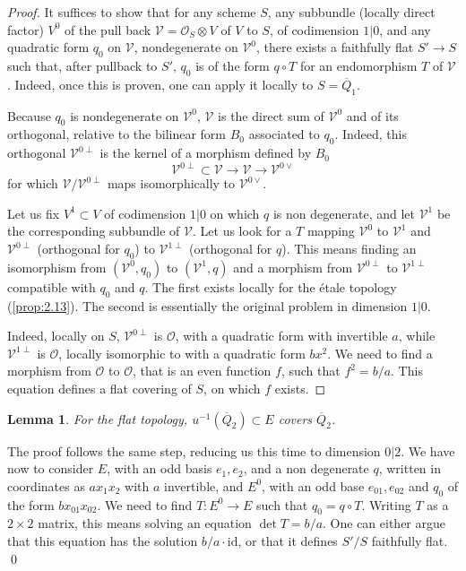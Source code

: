 \documentclass[11pt,a4paper]{article}
\theoremstyle{plain}
\newtheorem{lemma}[theorem]{Lemma}
\theoremstyle{definition}
\begin{document}
\begin{proof}
It suffices to show that for any scheme $S$, any subbundle (locally direct factor) $V^0$ of the pull back $\mathcal{V} = \mathcal{O}_S \otimes V$ of $V$ to $S$, of codimension $1|0$, and any quadratic form $q_0$ on $\mathcal{V}$, nondegenerate on $\mathcal{V}^0$, there exists a faithfully flat $S' \to S$ such that, after pullback to $S'$, $q_0$ is of the form $q \circ T$ for an endomorphism $T$ of $\mathcal{V}$. Indeed, once this is proven, one can apply it locally to $S = \overline{Q}_1$.

Because $q_0$ is nondegenerate on $\mathcal{V}^0$, $\mathcal{V}$ is the direct sum of $\mathcal{V}^0$ and of its orthogonal, relative to the bilinear form $B_0$ associated to $q_0$. Indeed, this orthogonal $\mathcal{V}^{0\perp}$ is the kernel of a morphism defined by $B_0$
\[
\mathcal{V}^{0\perp} \subset \mathcal{V} \to \mathcal{V} \to \mathcal{V}^{0\vee}
\]
for which $\mathcal{V}/\mathcal{V}^{0\perp}$ maps isomorphically to $\mathcal{V}^{0\vee}$.

Let us fix $V^1 \subset V$ of codimension $1|0$ on which $q$ is non degenerate, and let $\mathcal{V}^1$ be the corresponding subbundle of $\mathcal{V}$. Let us look for a $T$ mapping $\mathcal{V}^0$ to $\mathcal{V}^1$ and $\mathcal{V}^{0\perp}$ (orthogonal for $q_0$) to $\mathcal{V}^{1\perp}$ (orthogonal for $q$). This means finding an isomorphism from $(\mathcal{V}^0, q_0)$ to $(\mathcal{V}^1, q)$ and a morphism from $\mathcal{V}^{0\perp}$ to $\mathcal{V}^{1\perp}$ compatible with $q_0$ and $q$. The first exists locally for the \'etale topology (\ref{prop:2.13}). The second is essentially the original problem in dimension $1|0$.

Indeed, locally on $S$, $\mathcal{V}^{0\perp}$ is $\mathcal{O}$, with a quadratic form with invertible $a$, while $\mathcal{V}^{1\perp}$ is $\mathcal{O}$, locally isomorphic to with a quadratic form $bx^2$. We need to find a morphism from $\mathcal{O}$ to $\mathcal{O}$, that is an even function $f$, such that $f^2 = b/a$. This equation defines a flat covering of $S$, on which $f$ exists.
\end{proof}

\begin{lemma}\label{lem:3.10}
For the flat topology, $u^{-1}(\overline{Q}_2) \subset E$ covers $\overline{Q}_2$.
\end{lemma}

The proof follows the same step, reducing us this time to dimension $0|2$. We have now to consider $E$, with an odd basis $e_1, e_2$, and a non degenerate $q$, written in coordinates as $ax_1x_2$ with $a$ invertible, and $E^0$, with an odd base $e_{01}, e_{02}$ and $q_0$ of the form $bx_{01}x_{02}$. We need to find $T : E^0 \to E$ such that $q_0 = q \circ T$. Writing $T$ as a $2 \times 2$ matrix, this means solving an equation $\det T = b/a$. One can either argue that this equation has the solution $b/a \cdot \mathrm{id}$, or that it defines $S'/S$ faithfully flat.
\qed
\end{document}
